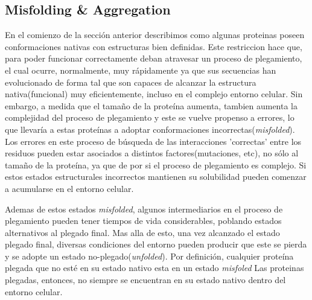 \subsection{Misfolding \& Aggregation}



En el comienzo de la sección anterior describimos como algunas proteinas poseen conformaciones nativas con estructuras bien definidas.
Este restriccion hace que, para poder funcionar correctamente deban atravesar un proceso de plegamiento, el cual ocurre, normalmente, muy rápidamente ya que
sus secuencias han evolucionado de forma tal que son capaces de alcanzar la estructura nativa(funcional) muy eficientemente, incluso en el complejo entorno celular.
Sin embargo, a medida que el tamaño de la proteína aumenta, tambien aumenta la complejidad del proceso de plegamiento y este se vuelve propenso a errores,
lo que llevaría a estas proteínas a adoptar conformaciones incorrectas(\textit{misfolded}). 
Los errores en este proceso de búsqueda de las interacciones 'correctas' entre los residuos pueden estar asociados a distintos factores(mutaciones, etc), no sólo al tamaño de la proteína, ya que de por si el proceso de plegamiento es complejo. 
Si estos estados estructurales incorrectos mantienen su solubilidad pueden comenzar a acumularse en el entorno celular.


Ademas de estos estados \textit{misfolded}, algunos intermediarios en el proceso de plegamiento pueden tener tiempos de vida considerables, poblando estados alternativos al plegado final.
Mas alla de esto, una vez alcanzado el estado plegado final, diversas condiciones del entorno pueden producir que este se pierda y se adopte un estado no-plegado(\textit{unfolded}).
Por definición, cualquier proteína plegada que no esté en su estado nativo esta en un estado \textit{misfoled}
Las proteinas plegadas, entonces, no siempre se encuentran en su estado nativo dentro del entorno celular. 

